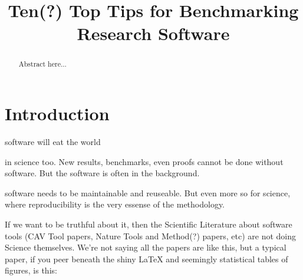 \documentclass[conference]{IEEEtran}
\begin{document}
%
\title{Ten(?) Top Tips for Benchmarking Research Software}

\author{
\and
{}
\and
{}
 }

\maketitle

\begin{abstract}
Abstract here...
\end{abstract}

\IEEEpeerreviewmaketitle

\section{Introduction}

software will eat the world

in science too. New results, benchmarks, even proofs cannot be
done without software. But the software is often in the background.

software needs to be maintainable and reuseable. But even more so for science, where reproducibility is the very essense of the methodology. 

If we want to be truthful about it, then the Scientific Literature
about software tools (CAV Tool papers, Nature Tools and Method(?) papers, etc)
are not doing Science themselves. We're not saying all the papers are
like this, but a typical paper, if you peer beneath the shiny \LaTeX
and seemingly statistical tables of figures, is this:
\end{document}

